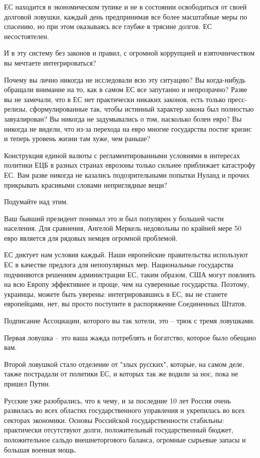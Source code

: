 ЕС находится в экономическом тупике и не в состоянии освободиться от своей
долговой ловушки, каждый день предпринимая все более масштабные меры по
спасению, но при этом оказываясь все глубже в трясине долгов. ЕС несостоятелен.

И в эту систему без законов и правил, с огромной коррупцией и взяточничеством
вы мечтаете интегрироваться?

Почему вы лично никогда не исследовали всю эту ситуацию? Вы когда-нибудь
обращали внимание на то, как в самом ЕС все запутанно и непрозрачно? Разве вы
не замечали, что в ЕС нет практически никаких законов, есть только
пресс-релизы, сформулированные так, чтобы истинный характер закона был
полностью завуалирован? Вы никогда не задумывались о том, насколько болен евро?
Вы никогда не видели, что из-за перехода на евро многие государства постиг
кризис и теперь уровень жизни там хуже, чем раньше?

Конструкция единой валюты с регламентированными условиями в интересах политики
ЕЦБ в разных странах еврозоны только сильнее приближает катастрофу ЕС. Вам
разве никогда не казались подозрительными попытки Нуланд и прочих прикрывать
красивыми словами неприглядные вещи?

Подумайте над этим.

Ваш бывший президент понимал это и был популярен у большей части населения. Для
сравнения, Ангелой Меркель недовольны по крайней мере 50%
евро является для рядовых немцев огромной проблемой.

ЕС диктует нам условия каждый. Наши европейские правительства используют ЕС в
качестве предлога для непопулярных мер. Национальные государства подчиняются
решениям администрации ЕС, таким образом, США могут повлиять на всю Европу
эффективнее и проще, чем на суверенные государства. Поэтому, украинцы, можете
быть уверены: интегрировавшись в ЕС, вы не станете европейцами, нет, вы просто
поступите в распоряжение Соединенных Штатов.

Подписание Ассоциации, которого вы так хотели, это – трюк с тремя ловушками.

Первая ловушка – это ваша жажда потреблять и богатство, которое было обещано
вам.

Второй ловушкой стало отделение от "злых русских", которые, на самом деле,
также пострадали от политики ЕС, и которых так же водили за нос, пока не пришел
Путин.

Русские уже разобрались, что к чему, и за последние 10 лет Россия очень
развилась во всех областях государственного управления и укрепилась во всех
секторах экономики. Основы Российской государственности стабильны: практически
отсутствуют долги, положительный государственный бюджет, положительное сальдо
внешнеторгового баланса, огромные сырьевые запасы и большая военная мощь.

